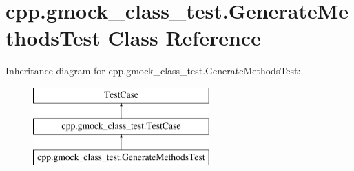 \hypertarget{classcpp_1_1gmock__class__test_1_1_generate_methods_test}{}\section{cpp.\+gmock\+\_\+class\+\_\+test.\+Generate\+Methods\+Test Class Reference}
\label{classcpp_1_1gmock__class__test_1_1_generate_methods_test}
Inheritance diagram for cpp.\+gmock\+\_\+class\+\_\+test.\+Generate\+Methods\+Test\+:\begin{figure}[H]
\begin{center}
\leavevmode
\includegraphics[height=3.000000cm]{dd/d60/classcpp_1_1gmock__class__test_1_1_generate_methods_test}
\end{center}
\end{figure}
